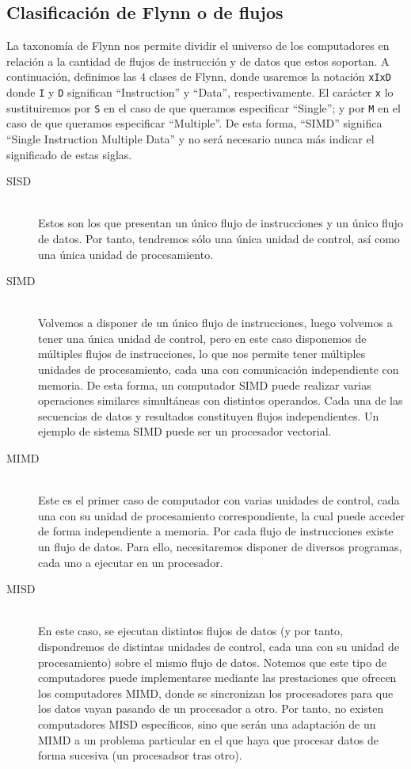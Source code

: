 \subsection{Clasificación de Flynn o de flujos}
La taxonomía de Flynn nos permite dividir el universo de los computadores en relación a la cantidad de flujos de instrucción y de datos que estos soportan. A continuación, definimos las 4 clases de Flynn, donde usaremos la notación \verb|xIxD| donde \verb|I| y \verb|D| significan ``Instruction'' y ``Data'', respectivamente. El carácter \verb|x| lo sustituiremos por \verb|S| en el caso de que queramos especificar ``Single''; y por \verb|M| en el caso de que queramos especificar ``Multiple''. De esta forma, ``SIMD'' significa ``Single Instruction Multiple Data'' y no será necesario nunca más indicar el significado de estas siglas.
\begin{description}
    \item [SISD]~\\
        Estos son los que presentan un único flujo de instrucciones y un único flujo de datos. Por tanto, tendremos sólo una única unidad de control, así como una única unidad de procesamiento. 
    \item [SIMD]~\\
        Volvemos a disponer de un único flujo de instrucciones, luego volvemos a tener una única unidad de control, pero en este caso disponemos de múltiples flujos de instrucciones, lo que nos permite tener múltiples unidades de procesamiento, cada una con comunicación independiente con memoria. De esta forma, un computador SIMD puede realizar varias operaciones similares simultáneas con distintos operandos. Cada una de las secuencias de datos y resultados constituyen flujos independientes. Un ejemplo de sistema SIMD puede ser un procesador vectorial.
    \item [MIMD]~\\
        Este es el primer caso de computador con varias unidades de control, cada una con su unidad de procesamiento correspondiente, la cual puede acceder de forma independiente a memoria. Por cada flujo de instrucciones existe un flujo de datos. Para ello, necesitaremos disponer de diversos programas, cada uno a ejecutar en un procesador.
    \item [MISD]~\\
        En este caso, se ejecutan distintos flujos de datos (y por tanto, dispondremos de distintas unidades de control, cada una con su unidad de procesamiento) sobre el mismo flujo de datos. Notemos que este tipo de computadores puede implementarse mediante las prestaciones que ofrecen los computadores MIMD, donde se sincronizan los procesadores para que los datos vayan pasando de un procesador a otro. Por tanto, no existen computadores MISD específicos, sino que serán una adaptación de un MIMD a un problema particular en el que haya que procesar datos de forma sucesiva (un procesadsor tras otro).
\end{description}

